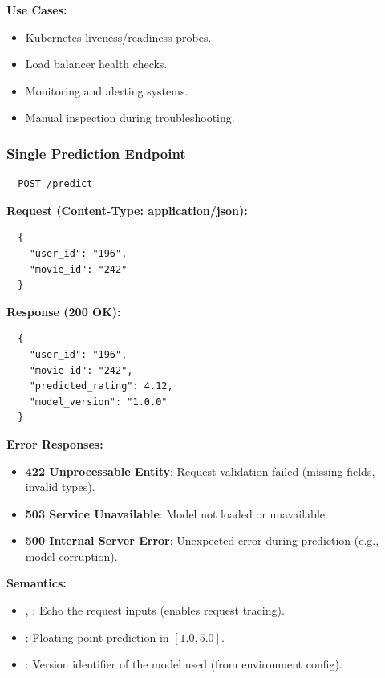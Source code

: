 \textbf{Use Cases:}
\begin{itemize}
  \item Kubernetes liveness/readiness probes.
  \item Load balancer health checks.
  \item Monitoring and alerting systems.
  \item Manual inspection during troubleshooting.
\end{itemize}

\subsubsection{Single Prediction Endpoint}

\begin{verbatim}
  POST /predict
\end{verbatim}

\textbf{Request (Content-Type: application/json):}
\begin{verbatim}
  {
    "user_id": "196",
    "movie_id": "242"
  }
\end{verbatim}

\textbf{Response (200 OK):}
\begin{verbatim}
  {
    "user_id": "196",
    "movie_id": "242",
    "predicted_rating": 4.12,
    "model_version": "1.0.0"
  }
\end{verbatim}

\textbf{Error Responses:}
\begin{itemize}
  \item \textbf{422 Unprocessable Entity}: Request validation failed (missing fields, invalid types).
  \item \textbf{503 Service Unavailable}: Model not loaded or unavailable.
  \item \textbf{500 Internal Server Error}: Unexpected error during prediction (e.g., model corruption).
\end{itemize}

\textbf{Semantics:}
\begin{itemize}
  \item {}, : Echo the request inputs (enables request tracing).
  \item {}: Floating-point prediction in $[1.0, 5.0]$.
  \item {}: Version identifier of the model used (from environment config).
\end{itemize}

